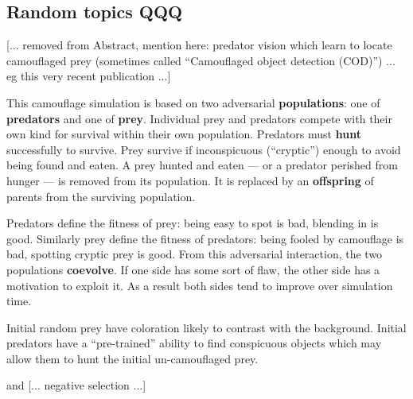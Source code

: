 \documentclass[sigconf]{acmart}
\begin{document}
\subsection{Random topics QQQ}
[... removed from Abstract, mention here: predator vision which learn to locate camouflaged prey (sometimes called “Camouflaged object detection (COD)”) ... eg this very recent publication \cite{Zhang2022} ...]
\par
This camouflage simulation is based on two adversarial \textbf{populations}: one of \textbf{predators} and one of \textbf{prey}. Individual prey and predators compete with their own kind for survival within their own population. Predators must \textbf{hunt} successfully to survive. Prey survive if inconspicuous (“cryptic”) enough to avoid being found and eaten. A prey hunted and eaten — or a predator perished from hunger — is removed from its population. It is replaced by an \textbf{offspring} of parents from the surviving population.
\par
Predators define the fitness of prey: being easy to spot is bad, blending in is good. Similarly prey define the fitness of predators: being fooled by camouflage is bad, spotting cryptic prey is good. From this adversarial interaction, the two populations \textbf{coevolve}. If one side has some sort of flaw, the other side has a motivation to exploit it. As a result both sides tend to improve over simulation time.
\par
Initial random prey have coloration likely to contrast with the background. Initial predators have a “pre-trained” ability to find conspicuous objects which may allow them to hunt the initial un-camouflaged prey.
\par
[... relative fitness ...] and [... negative selection ...]
\par
[... tournaments relative fitness in game-like competition ...]
\end{document}
